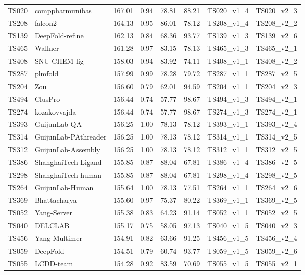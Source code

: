 \begin{longtable}{llllllll}
TS020 & comppharmunibas & 167.01 & 0.94 & 78.81 & 88.21 & TS020\_v1\_4 & TS020\_v2\_3 \\ 
TS208 & falcon2 & 164.13 & 0.95 & 86.01 & 78.12 & TS208\_v1\_4 & TS208\_v2\_2 \\ 
TS139 & DeepFold-refine & 162.13 & 0.84 & 68.36 & 93.77 & TS139\_v1\_3 & TS139\_v2\_6 \\ 
TS465 & Wallner & 161.28 & 0.97 & 83.15 & 78.13 & TS465\_v1\_3 & TS465\_v2\_1 \\ 
TS408 & SNU-CHEM-lig & 158.03 & 0.94 & 83.92 & 74.11 & TS408\_v1\_1 & TS408\_v2\_2 \\ 
TS287 & plmfold & 157.99 & 0.99 & 78.28 & 79.72 & TS287\_v1\_1 & TS287\_v2\_5 \\ 
TS204 & Zou & 156.60 & 0.79 & 62.01 & 94.59 & TS204\_v1\_1 & TS204\_v2\_3 \\ 
TS494 & ClusPro & 156.44 & 0.74 & 57.77 & 98.67 & TS494\_v1\_3 & TS494\_v2\_1 \\ 
TS274 & kozakovvajda & 156.44 & 0.74 & 57.77 & 98.67 & TS274\_v1\_3 & TS274\_v2\_1 \\ 
TS393 & GuijunLab-QA & 156.25 & 1.00 & 78.13 & 78.12 & TS393\_v1\_1 & TS393\_v2\_4 \\ 
TS314 & GuijunLab-PAthreader & 156.25 & 1.00 & 78.13 & 78.12 & TS314\_v1\_1 & TS314\_v2\_5 \\ 
TS312 & GuijunLab-Assembly & 156.25 & 1.00 & 78.13 & 78.12 & TS312\_v1\_1 & TS312\_v2\_5 \\ 
TS386 & ShanghaiTech-Ligand & 155.85 & 0.87 & 88.04 & 67.81 & TS386\_v1\_4 & TS386\_v2\_5 \\ 
TS298 & ShanghaiTech-human & 155.85 & 0.87 & 88.04 & 67.81 & TS298\_v1\_4 & TS298\_v2\_5 \\ 
TS264 & GuijunLab-Human & 155.64 & 1.00 & 78.13 & 77.51 & TS264\_v1\_1 & TS264\_v2\_6 \\ 
TS369 & Bhattacharya & 155.60 & 0.97 & 75.37 & 80.22 & TS369\_v1\_1 & TS369\_v2\_5 \\ 
TS052 & Yang-Server & 155.38 & 0.83 & 64.23 & 91.14 & TS052\_v1\_1 & TS052\_v2\_5 \\ 
TS040 & DELCLAB & 155.17 & 0.75 & 58.05 & 97.13 & TS040\_v1\_5 & TS040\_v2\_3 \\ 
TS456 & Yang-Multimer & 154.91 & 0.82 & 63.66 & 91.25 & TS456\_v1\_5 & TS456\_v2\_4 \\ 
TS059 & DeepFold & 154.51 & 0.79 & 60.74 & 93.77 & TS059\_v1\_5 & TS059\_v2\_6 \\ 
TS055 & LCDD-team & 154.28 & 0.92 & 83.59 & 70.69 & TS055\_v1\_5 & TS055\_v2\_1 \\ 

\end{longtable}
